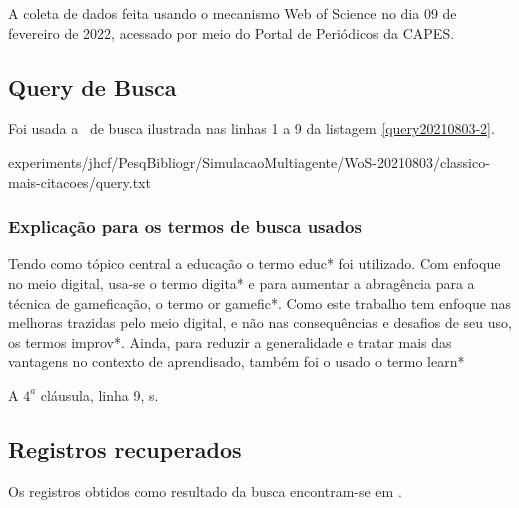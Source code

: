 A coleta de dados feita usando o mecanismo Web of Science no dia 09 de fevereiro de 2022, acessado por meio do Portal de Periódicos da CAPES.


\subsection{Query de Busca}

Foi usada a \query\  de busca ilustrada nas linhas 1 a 9 da listagem \ref{query20210803-2}.


{experiments/jhcf/PesqBibliogr/SimulacaoMultiagente/WoS-20210803/classico-mais-citacoes/query.txt}

\subsubsection{Explicação para os termos de busca usados\label{}}



Tendo como tópico central a educação o termo educ*  foi utilizado. Com enfoque no meio digital, usa-se o termo digita* e para aumentar a abragência para  a técnica de gameficação, o termo or gamefic*. Como este trabalho tem enfoque nas melhoras trazidas pelo meio digital, e não nas consequências e desafios de seu uso, os termos improv*. Ainda, para reduzir a generalidade e tratar mais das vantagens no contexto de aprendisado, também foi o usado o termo learn*





A $4^{a}$ cláusula, linha 9,  s.

\subsection{Registros recuperados}

Os  registros obtidos como resultado da busca encontram-se em \url{}. 


